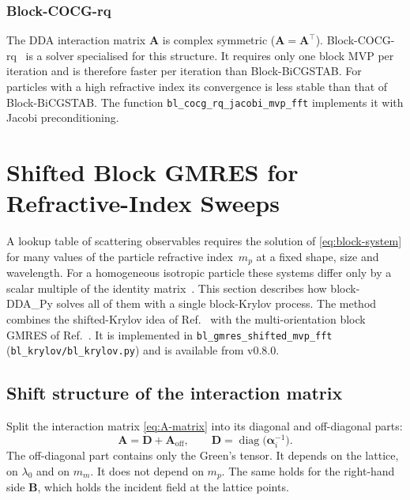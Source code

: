 \documentclass[11pt,a4paper]{article}
\begin{document}
\subsubsection{Block-COCG-rq}
\label{sec:cocg}

The DDA interaction matrix $\mathbf{A}$ is complex symmetric
($\mathbf{A} = \mathbf{A}^\top$).
Block-COCG-rq~\cite{Gu2016} is a solver specialised for this
structure.
It requires only one block MVP per iteration and is therefore faster
per iteration than Block-BiCGSTAB.
For particles with a high refractive index its convergence is less
stable than that of Block-BiCGSTAB.
The function \texttt{bl\_cocg\_rq\_jacobi\_mvp\_fft} implements it with
Jacobi preconditioning.

\section{Shifted Block GMRES for Refractive-Index Sweeps}
\label{sec:shifted-gmres}

A lookup table of scattering observables requires the solution of
\eqref{eq:block-system} for many values of the particle refractive
index~$m_p$ at a fixed shape, size and wavelength.
For a homogeneous isotropic particle these systems differ only by a
scalar multiple of the identity matrix~\cite{Argentin2026}.
This section describes how block-DDA\_Py solves all of them with a
single block-Krylov process.
The method combines the shifted-Krylov idea of
Ref.~\cite{Argentin2026} with the multi-orientation block GMRES of
Ref.~\cite{Moteki2026}.
It is implemented in \texttt{bl\_gmres\_shifted\_mvp\_fft}
(\texttt{bl\_krylov/bl\_krylov.py}) and is available from v0.8.0.

\subsection{Shift structure of the interaction matrix}
\label{sec:shift-structure}

Split the interaction matrix \eqref{eq:A-matrix} into its diagonal and
off-diagonal parts:
\begin{equation}
  \mathbf{A} = \mathbf{D} + \mathbf{A}_{\text{off}},
  \qquad
  \mathbf{D} = \operatorname{diag}\bigl(\boldsymbol{\alpha}_i^{-1}\bigr).
  \label{eq:A-split}
\end{equation}
The off-diagonal part contains only the Green's tensor.
It depends on the lattice, on $\lambda_0$ and on $m_m$.
It does not depend on $m_p$.
The same holds for the right-hand side $\mathbf{B}$, which holds the
incident field at the lattice points.
\end{document}
